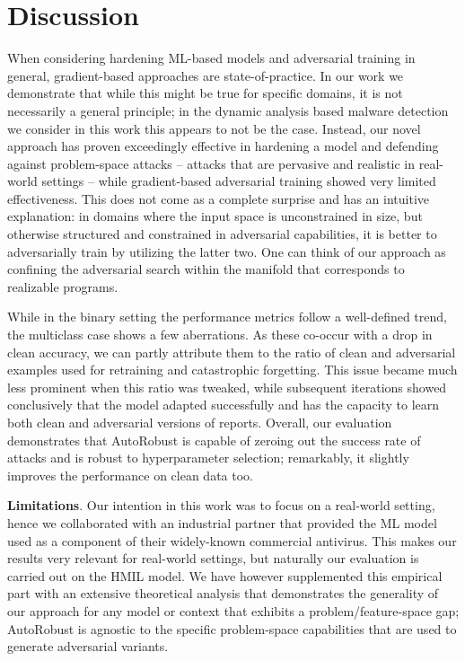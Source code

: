 \section{Discussion}

When considering hardening ML-based models and adversarial training in general, gradient-based approaches are state-of-practice.
In our work we demonstrate that while this might be true for specific domains, it is not necessarily a general principle; in the dynamic analysis based malware detection we consider in this work this appears to not be the case.
Instead, our novel approach has proven exceedingly effective in hardening a model and defending against problem-space attacks -- attacks that are pervasive and realistic in real-world settings -- while gradient-based adversarial training showed very limited effectiveness.
This does not come as a complete surprise and has an intuitive explanation: in domains where the input space is unconstrained in size, but otherwise structured and constrained in adversarial capabilities, it is better to adversarially train by utilizing the latter two.
One can think of our approach as confining the adversarial search within the manifold that corresponds to realizable programs.

While in the binary setting the performance metrics follow a well-defined trend, the multiclass case shows a few aberrations.
As these co-occur with a drop in clean accuracy, we can partly attribute them to the ratio of clean and adversarial examples used for retraining and catastrophic forgetting.
This issue became much less prominent when this ratio was tweaked, while subsequent iterations showed conclusively that the model adapted successfully and has the capacity to learn both clean and adversarial versions of reports.
Overall, our evaluation demonstrates that AutoRobust is capable of zeroing out the success rate of attacks and is robust to hyperparameter selection; remarkably, it slightly improves the performance on clean data too.

\textbf{Limitations}. Our intention in this work was to focus on a real-world setting, hence we collaborated with an industrial partner that provided the ML model used as a component of their widely-known commercial antivirus.
This makes our results very relevant for real-world settings, but naturally our evaluation is carried out on the \gls{HMIL} model.
We have however supplemented this empirical part with an extensive theoretical analysis that demonstrates the generality of our approach for any model or context that exhibits a problem/feature-space gap; AutoRobust is agnostic to the specific problem-space capabilities that are used to generate adversarial variants.

